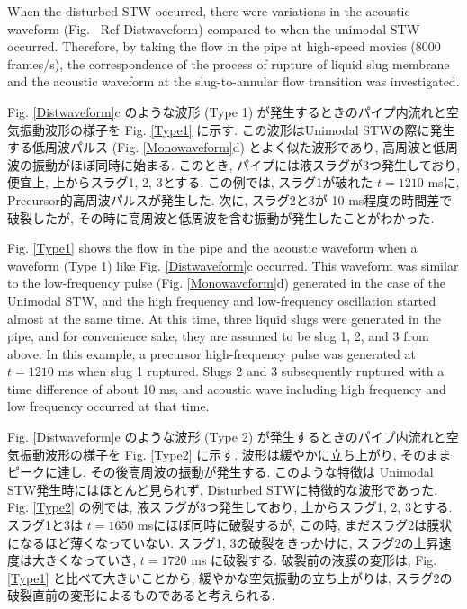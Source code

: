 \documentclass[12pt]{article}
\begin{document}
When the disturbed STW occurred, there were variations in the acoustic waveform (Fig. \ Ref {Distwaveform}) compared to when the unimodal STW occurred.
Therefore, by taking the flow in the pipe at high-speed movies (8000 frames/s), the correspondence of the process of rupture of liquid slug membrane and the acoustic waveform at the slug-to-annular flow transition was investigated.

Fig. \ref{Distwaveform}c のような波形 (Type 1) が発生するときのパイプ内流れと空気振動波形の様子を Fig. \ref{Type1} に示す. 
この波形はUnimodal STWの際に発生する低周波パルス (Fig. \ref{Monowaveform}d) とよく似た波形であり, 高周波と低周波の振動がほぼ同時に始まる. 
このとき, パイプには液スラグが3つ発生しており, 便宜上, 上からスラグ1, 2, 3とする. 
この例では, スラグ1が破れた $t=1210$ msに, Precursor的高周波パルスが発生した. 
次に, スラグ2と3が 10 ms程度の時間差で破裂したが, その時に高周波と低周波を含む振動が発生したことがわかった.

Fig. \ref{Type1} shows the flow in the pipe and the acoustic waveform when a waveform (Type 1) like Fig. \ref {Distwaveform}c occurred.
This waveform was similar to the low-frequency pulse (Fig. \ref {Monowaveform}d) generated in the case of the Unimodal STW, and the high frequency and low-frequency oscillation started almost at the same time.
At this time, three liquid slugs were generated in the pipe, and for convenience sake, they are assumed to be slug 1, 2, and 3 from above.
In this example, a precursor high-frequency pulse was generated at $t = 1210$ ms when slug 1 ruptured.
Slugs 2 and 3 subsequently ruptured with a time difference of about 10 ms, and acoustic wave including high frequency and low frequency occurred at that time.

Fig. \ref{Distwaveform}e のような波形 (Type 2) が発生するときのパイプ内流れと空気振動波形の様子を Fig. \ref{Type2} に示す. 
波形は緩やかに立ち上がり, そのままピークに達し, その後高周波の振動が発生する. 
このような特徴は Unimodal STW発生時にはほとんど見られず, Disturbed STWに特徴的な波形であった. 
Fig. \ref{Type2} の例では, 液スラグが3つ発生しており, 上からスラグ1, 2, 3とする. スラグ1と3は $t=1650$ msにほぼ同時に破裂するが, この時, まだスラグ2は膜状になるほど薄くなっていない. スラグ1, 3の破裂をきっかけに, スラグ2の上昇速度は大きくなっていき, $t=1720$ ms に破裂する. 破裂前の液膜の変形は, Fig. \ref{Type1} と比べて大きいことから, 緩やかな空気振動の立ち上がりは, スラグ2の破裂直前の変形によるものであると考えられる.
\end{document}
